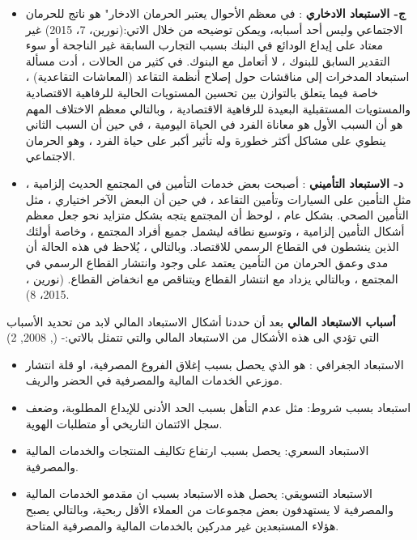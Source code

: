 \documentclass[10pt,a4paper]{report}
\begin{document}
\begin{doublespacing}
\begin{itemize}
	\item \textbf{ج- الاستبعاد الادخاري }: 
	في معظم الأحوال يعتبر الحرمان الادخار" هو ناتج للحرمان الاجتماعي وليس أحد أسبابه، ويمكن توضيحه من خلال الاتي:(نورين، 7، 2015) غير معتاد على إيداع الودائع في البنك بسبب التجارب السابقة غير الناجحة أو سوء التقدير السابق للبنوك ، لا أتعامل مع البنوك. في كثير من الحالات ، أدت مسألة استبعاد المدخرات إلى مناقشات حول إصلاح أنظمة التقاعد (المعاشات التقاعدية) ، خاصة فيما يتعلق بالتوازن بين تحسين المستويات الحالية للرفاهية الاقتصادية والمستويات المستقبلية البعيدة للرفاهية الاقتصادية ، وبالتالي معظم الاختلاف المهم هو أن السبب الأول هو معاناة الفرد في الحياة اليومية ، في حين أن السبب الثاني ينطوي على مشاكل أكثر خطورة وله تأثير أكبر على حياة الفرد ، وهو الحرمان الاجتماعي.
	
	\item \textbf{د- الاستبعاد التأميني }: 
	أصبحت بعض خدمات التأمين في المجتمع الحديث إلزامية ، مثل التأمين على السيارات وتأمين التقاعد ، في حين أن البعض الآخر اختياري ، مثل التأمين الصحي. بشكل عام ، لوحظ أن المجتمع يتجه بشكل متزايد نحو جعل معظم أشكال التأمين إلزامية ، وتوسيع نطاقه ليشمل جميع أفراد المجتمع ، وخاصة أولئك الذين ينشطون في القطاع الرسمي للاقتصاد. وبالتالي ، يُلاحظ في هذه الحالة أن مدى وعمق الحرمان من التأمين يعتمد على وجود وانتشار القطاع الرسمي في المجتمع ، وبالتالي يزداد مع انتشار القطاع ويتناقص مع انخفاض القطاع. (نورين ، 2015، 8).
	
\end{itemize}

\textbf{أسباب الاستبعاد المالي} بعد أن حددنا أشكال الاستبعاد المالي لابد من تحديد الأسباب التي تؤدي الى هذه الأشكال من الاستبعاد المالي والتي تتمثل بالاتي:- (, 2008, 2)

\begin{itemize}
	\item الاستبعاد الجغرافي : هو الذي يحصل بسبب إغلاق الفروع المصرفية، او قلة انتشار موزعي الخدمات المالية والمصرفية في الحضر والريف.
	\item استبعاد بسبب شروط: مثل عدم التأهل بسبب الحد الأدنى للإيداع المطلوبة، وضعف سجل الائتمان التاريخي أو متطلبات الهوية.
	\item الاستبعاد السعري: يحصل بسبب ارتفاع تكاليف المنتجات والخدمات المالية والمصرفية.
	\item الاستبعاد التسويقي: يحصل هذه الاستبعاد بسبب ان مقدمو الخدمات المالية والمصرفية لا يستهدفون بعض مجموعات من العملاء الأقل ربحية، وبالتالي يصبح هؤلاء المستبعدين غير مدركين بالخدمات المالية والمصرفية المتاحة.
\end{itemize}

\end{doublespacing}
\end{document}
